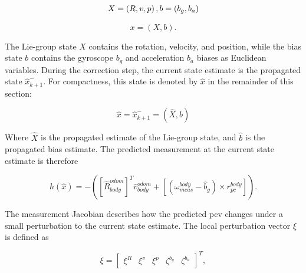 \documentclass[report.tex]{subfiles}
\begin{document}
    \begin{equation}
        X
        =
        \left(
            R,
            v,
            p
        \right), \\ 
        b = \left(
            b_g,
            b_a
        \right)
        \label{eq:State}
    \end{equation}
    
    \begin{equation}
        x
        =
        \left(
            X,
            b
        \right).
        \label{eq:completeFilterState}
    \end{equation}
 
    The Lie-group state $X$ contains the rotation, velocity, and position, while the bias state $b$ contains the gyroscope $b_g$ and acceleration $b_a$ biases as Euclidean variables. During the correction step, the current state estimate is the propagated state $\hat{x}_{k+1}^{-}$. For compactness, this state is denoted by $\hat{x}$ in the remainder of this section:

    \begin{equation}
        \hat{x}
        =
        \hat{x}_{k+1}^{-}
        =
        \left(
            \hat{X},
            \hat{b}
        \right)
        \label{eq:estimatedCompleteFilterState}
    \end{equation}

    Where $\hat{X}$ is the propagated estimate of the Lie-group state, and $\hat{b}$ is the propagated bias estimate. The predicted measurement at the current state estimate is therefore

    \begin{equation}
        h(\hat{x})
        =
        -\left(
            [\hat{R}_{body}^{odom}]^{T}
            \hat{v}_{body}^{odom}
            +
            \left[
                \left(
                    \omega_{meas}^{body}
                    -
                    \hat{b}_g
                \right)
                \times
                r_{pc}^{body}
            \right]
        \right).
        \label{eq:predictedMeasurementAtEstimate}
    \end{equation}

    The measurement Jacobian describes how the predicted \gls{pcv} changes under a small perturbation to the current state estimate. The local perturbation vector $\xi$ is defined as

    \begin{equation}
        \xi
        =
        \begin{bmatrix}
            \xi^R &  \xi^v & \xi^p & \zeta^{b_g} & \zeta^{b_a}
        \end{bmatrix} ^{T},
        \label{eq:ErrorStateVector}
    \end{equation}
\end{document}
